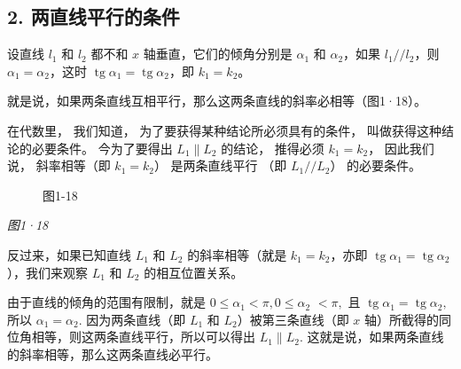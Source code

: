 \subsection{2.
两直线平行的条件}\label{ux4e24ux76f4ux7ebfux5e73ux884cux7684ux6761ux4ef6}

设直线 \(l_{1}\) 和 \(l_{2}\) 都不和 \(x\) 轴垂直，它们的倾角分别是
\(\alpha_{1}\) 和 \(\alpha_{2}\)，如果 \(l_{1} / / l_{2}\)，则
\(\alpha_{1} = \alpha_{2}\)，这时
\(\operatorname{tg} \alpha_{1} = \operatorname{tg} \alpha_{2}\)，即
\(k_{1} = k_{2}\)。

就是说，如果两条直线互相平行，那么这两条直线的斜率必相等（图1·18）。

在代数里， 我们知道， 为了要获得某种结论所必须具有的条件，
叫做获得这种结论的必要条件。 今为了要得出 \(L_{1} \parallel L_{2}\)
的结论， 推得必须 \(k_{1} = k_{2}\)， 因此我们说， 斜率相等（即
\(k_{1} = k_{2}\)） 是两条直线平行 （即 \(L_{1} // L_{2}\)）
的必要条件。

\begin{figure}
\centering
{}
\caption{图1-18}
\end{figure}

\emph{图1·18}

反过来，如果已知直线 \(L_{1}\) 和 \(L_{2}\) 的斜率相等（就是
\(k_{1} = k_{2}\)，亦即
\(\operatorname{tg} \alpha_{1} = \operatorname{tg} \alpha_{2}\)），我们来观察
\(L_{1}\) 和 \(L_{2}\) 的相互位置关系。

由于直线的倾角的范围有限制，就是
\(0 \leqslant \alpha_{1} < \pi, 0 \leqslant \alpha_{2}\) \(<\pi,\) 且
\(\operatorname{tg}\alpha_{1}=\operatorname{tg}\alpha_{2},\) 所以
\(\alpha_{1}=\alpha_{2}.\) 因为两条直线（即 \(L_{1}\) 和
\(L_{2}\)）被第三条直线（即 \(x\)
轴）所截得的同位角相等，则这两条直线平行，所以可以得出
\(L_{1}\parallel L_{2}.\)
这就是说，如果两条直线的斜率相等，那么这两条直线必平行。

